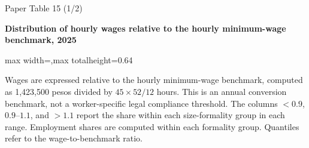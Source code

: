 \begin{frame}{Paper Table 15 (1/2)}
\begin{minipage}{\textwidth}\small\textbf{Distribution of hourly wages relative to the hourly minimum-wage benchmark, 2025}\end{minipage}\par\vspace{0.15cm}
\centering\begingroup\fontsize{8.5}{10}\selectfont
\setlength{\tabcolsep}{4pt}\renewcommand{\arraystretch}{1.06}
\begin{adjustbox}{max width=\textwidth,max totalheight=0.64\textheight}

\end{adjustbox}\endgroup\par\vspace{0.10cm}
{\fontsize{6.5}{7.5}\selectfont\raggedright Wages are expressed relative to the hourly minimum-wage benchmark, computed as 1,423,500 pesos divided by $45\times52/12$ hours. This is an annual conversion benchmark, not a worker-specific legal compliance threshold. The columns $<0.9$, $0.9$--$1.1$, and $>1.1$ report the share within each size-formality group in each range. Employment shares are computed within each formality group. Quantiles refer to the wage-to-benchmark ratio.\par}
\end{frame}

